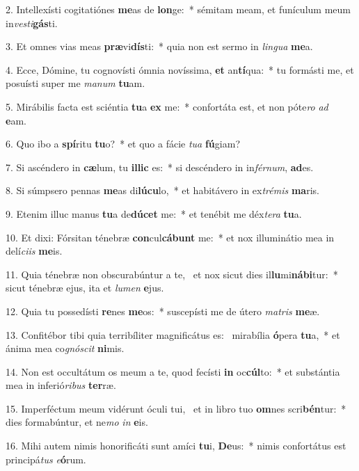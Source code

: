 2. Intellexísti cogitatiónes \textbf{me}as de \textbf{lon}ge:~*  sémitam meam, et funículum meum in\textit{ves}\textit{ti}\textbf{gás}ti.\

3. Et omnes vias meas \textbf{præ}vi\textbf{dís}ti:~*  quia non est sermo in \textit{lin}\textit{gua} \textbf{me}a.\

4. Ecce, Dómine, tu cognovísti ómnia novíssima, \textbf{et} an\textbf{tí}qua:~*  tu formásti me, et posuísti super me \textit{ma}\textit{num} \textbf{tu}am.\

5. Mirábilis facta est sciéntia \textbf{tu}a \textbf{ex} me:~*  confortáta est, et non póte\textit{ro} \textit{ad} \textbf{e}am.\

6. Quo ibo a \textbf{spí}ritu \textbf{tu}o?~*  et quo a fácie \textit{tu}\textit{a} \textbf{fú}giam?\

7. Si ascéndero in \textbf{cæ}lum, tu \textbf{il}\textbf{lic} es:~*  si descéndero in in\textit{fér}\textit{num}, \textbf{ad}es.\

8. Si súmpsero pennas \textbf{me}as di\textbf{lú}\textbf{cu}lo,~*  et habitávero in ex\textit{tré}\textit{mis} \textbf{ma}ris.\

9. Etenim illuc manus \textbf{tu}a de\textbf{dú}\textbf{cet} me:~*  et tenébit me déx\textit{te}\textit{ra} \textbf{tu}a.\

10. Et dixi: Fórsitan ténebræ \textbf{con}cul\textbf{cá}\textbf{bunt} me:~*  et nox illuminátio mea in delí\textit{ci}\textit{is} \textbf{me}is.\

11. Quia ténebræ non obscurabúntur a te, \dag\  et nox sicut dies il\textbf{lu}mi\textbf{ná}\textbf{bi}tur:~*  sicut ténebræ ejus, ita et \textit{lu}\textit{men} \textbf{e}jus.\

12. Quia tu possedísti \textbf{re}nes \textbf{me}os:~*  suscepísti me de útero \textit{ma}\textit{tris} \textbf{me}æ.\

13. Confitébor tibi quia terribíliter magnificátus es: \dag\  mirabília \textbf{ó}pera \textbf{tu}a,~*  et ánima mea co\textit{gnó}\textit{scit} \textbf{ni}mis.\

14. Non est occultátum os meum a te, quod fecísti \textbf{in} oc\textbf{cúl}to:~*  et substántia mea in inferió\textit{ri}\textit{bus} \textbf{ter}ræ.\

15. Imperféctum meum vidérunt óculi tui, \dag\  et in libro tuo \textbf{om}nes scri\textbf{bén}tur:~*  dies formabúntur, et ne\textit{mo} \textit{in} \textbf{e}is.\

16. Mihi autem nimis honorificáti sunt amíci \textbf{tu}i, \textbf{De}us:~*  nimis confortátus est principá\textit{tus} \textit{e}\textbf{ó}rum.\

